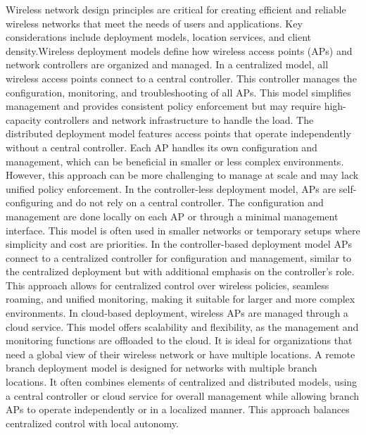 \documentclass{article}
\begin{document}
	Wireless network design principles are critical for creating efficient and reliable wireless networks that meet the needs of users and applications. Key considerations include deployment models, location services, and client density.Wireless deployment models define how wireless access points (APs) and network controllers are organized and managed. In a centralized model, all wireless access points connect to a central controller. This controller manages the configuration, monitoring, and troubleshooting of all APs. This model simplifies management and provides consistent policy enforcement but may require high-capacity controllers and network infrastructure to handle the load. The distributed deployment model features access points that operate independently without a central controller. Each AP handles its own configuration and management, which can be beneficial in smaller or less complex environments. However, this approach can be more challenging to manage at scale and may lack unified policy enforcement. In the controller-less deployment model, APs are self-configuring and do not rely on a central controller. The configuration and management are done locally on each AP or through a minimal management interface. This model is often used in smaller networks or temporary setups where simplicity and cost are priorities. In the controller-based deployment model APs connect to a centralized controller for configuration and management, similar to the centralized deployment but with additional emphasis on the controller’s role. This approach allows for centralized control over wireless policies, seamless roaming, and unified monitoring, making it suitable for larger and more complex environments. In cloud-based deployment, wireless APs are managed through a cloud service. This model offers scalability and flexibility, as the management and monitoring functions are offloaded to the cloud. It is ideal for organizations that need a global view of their wireless network or have multiple locations. A remote branch deployment model is designed for networks with multiple branch locations. It often combines elements of centralized and distributed models, using a central controller or cloud service for overall management while allowing branch APs to operate independently or in a localized manner. This approach balances centralized control with local autonomy.\\
\end{document}
